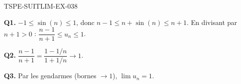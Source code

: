 \begin{corrige}{TSPE-SUITLIM-EX-038}

\textbf{Q1.} $-1 \leq \sin(n) \leq 1$, donc $n-1 \leq n+\sin(n) \leq n+1$. En divisant par $n+1>0$ : $\dfrac{n-1}{n+1} \leq u_n \leq 1$.

\textbf{Q2.} $\dfrac{n-1}{n+1} = \dfrac{1-1/n}{1+1/n} \to 1$.

\textbf{Q3.} Par les gendarmes (bornes $\to 1$), $\boxed{\lim u_n = 1}$.

\end{corrige}

